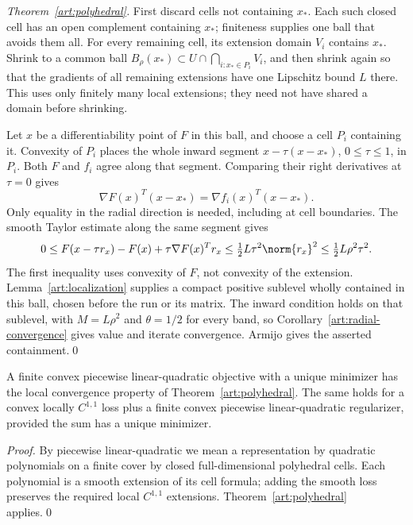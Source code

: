 

\begin{proof}[Theorem~\ref{art:polyhedral}]
First discard cells not containing $x_*$. Each such closed cell has an open
complement containing $x_*$; finiteness supplies one ball that avoids them all.
For every remaining cell, its extension domain $V_i$ contains $x_*$.
Shrink to a common ball $B_\rho(x_*)\subset U\cap\bigcap_{i:x_*\in P_i}V_i$,
and then shrink again so that the gradients of all remaining extensions have
one Lipschitz bound $L$ there. This uses only finitely many local extensions;
they need not have shared a domain before shrinking.

Let $x$ be a differentiability point of $F$ in this ball, and choose a cell
$P_i$ containing it. Convexity of $P_i$ places the whole inward segment
$x-\tau(x-x_*)$, $0\le\tau\le1$, in $P_i$. Both $F$ and $f_i$ agree
along that segment. Comparing their right derivatives at $\tau=0$ gives
\[
 \nabla F(x)^T(x-x_*)=\nabla f_i(x)^T(x-x_*).
\]
Only equality in the radial direction is needed, including at cell boundaries.
The smooth Taylor estimate along the same segment gives
\[
 0\le F(x-\tau r_x)-F(x)+\tau\nabla F(x)^Tr_x
       \le\tfrac12L\tau^2\norm{r_x}^2
       \le\tfrac12L\rho^2\tau^2.
\]
The first inequality uses convexity of $F$, not convexity of the extension.
Lemma~\ref{art:localization} supplies a compact positive sublevel wholly
contained in this ball, chosen before the run or its matrix. The inward
condition holds on that sublevel, with $M=L\rho^2$ and $\theta=1/2$ for every
band, so Corollary~\ref{art:radial-convergence}
gives value and iterate convergence. Armijo gives the asserted containment.\qed
\end{proof}

\begin{corollary}\label{art:plq}
A finite convex piecewise linear-quadratic objective with a unique minimizer
has the local convergence property of Theorem~\ref{art:polyhedral}.
The same holds for a convex locally $C^{1,1}$ loss plus a finite convex
piecewise linear-quadratic regularizer, provided the sum has a unique minimizer.
\end{corollary}
\begin{proof}
By piecewise linear-quadratic we mean a representation by quadratic polynomials
on a finite cover by closed full-dimensional polyhedral cells. Each polynomial is a smooth
extension of its cell formula; adding the smooth loss preserves the required
local $C^{1,1}$ extensions. Theorem~\ref{art:polyhedral} applies.\qed
\end{proof}

